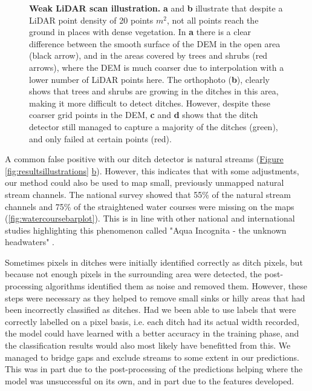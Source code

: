 \documentclass[11pt, review]{elsarticle} %
\begin{document}
\begin{figure}[!htb]
    \caption{\textbf{Weak LiDAR scan illustration.} \textbf{a} and \textbf{b} illustrate that despite a LiDAR point density of 20 points $m^2$, not all points reach the ground in places with dense vegetation. In \textbf{a} there is a clear difference between the smooth surface of the DEM in the open area (black arrow), and in the areas covered by trees and shrubs (red arrows), where the DEM is much coarser due to interpolation with a lower number of LiDAR points here. The orthophoto (\textbf{b}), clearly shows that trees and shrubs are growing in the ditches in this area, making it more difficult to detect ditches. However, despite these coarser grid points in the DEM, \textbf{c} and \textbf{d} shows that the ditch detector still managed to capture a majority of the ditches (green), and only failed at certain points (red).}
    \label{fig:resultstreesbushes}
\end{figure}

A common false positive with our ditch detector is natural streams (\hyperref[fig:resultsillustrations]{Figure} \ref{fig:resultsillustrations} \hyperref[fig:resultsillustrations]{b}). However, this indicates that with some adjustments, our method could also be used to map small, previously unmapped natural stream channels. The national survey showed that 55\% of the natural stream channels and 75\% of the straightened water courses were missing on the maps (\autoref{fig:watercoursebarplot}). This is in line with other national \citep{kuglerova} and international \citep{benstead} studies highlighting this phenomenon called "Aqua Incognita - the unknown headwaters" \citep{bishop,kuglerova}.

Sometimes pixels in ditches were initially identified correctly as ditch pixels, but because not enough pixels in the surrounding area were detected, the post-processing algorithms identified them as noise and removed them. However, these steps were necessary as they helped to remove small sinks or hilly areas that had been incorrectly classified as ditches. Had we been able to use labels that were correctly labelled on a pixel basis, i.e. each ditch had its actual width recorded, the model could have learned with a better accuracy in the training phase, and the classification results would also most likely have benefitted from this. We managed to bridge gaps and exclude streams to some extent in our predictions. This was in part due to the post-processing of the predictions helping where the model was unsuccessful on its own, and in part due to the features developed.
\end{document}
